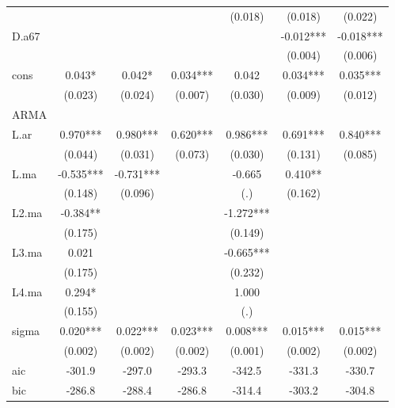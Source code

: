 \begin{tabular}{lcccccc}
            &               &               &               &     (0.018)   &     (0.018)   &     (0.022)   \\
D.a67       &               &               &               &               &      -0.012***&      -0.018***\\
            &               &               &               &               &     (0.004)   &     (0.006)   \\
cons       &       0.043*  &       0.042*  &       0.034***&       0.042   &       0.034***&       0.035***\\
            &     (0.023)   &     (0.024)   &     (0.007)   &     (0.030)   &     (0.009)   &     (0.012)   \\
\midrule
ARMA        &               &               &               &               &               &               \\
L.ar        &       0.970***&       0.980***&       0.620***&       0.986***&       0.691***&       0.840***\\
            &     (0.044)   &     (0.031)   &     (0.073)   &     (0.030)   &     (0.131)   &     (0.085)   \\
L.ma        &      -0.535***&      -0.731***&               &      -0.665   &       0.410** &               \\
            &     (0.148)   &     (0.096)   &               &         (.)   &     (0.162)   &               \\
L2.ma       &      -0.384** &               &               &      -1.272***&               &               \\
            &     (0.175)   &               &               &     (0.149)   &               &               \\
L3.ma       &       0.021   &               &               &      -0.665***&               &               \\
            &     (0.175)   &               &               &     (0.232)   &               &               \\
L4.ma       &       0.294*  &               &               &       1.000   &               &               \\
            &     (0.155)   &               &               &         (.)   &               &               \\
\midrule
sigma       &       0.020***&       0.022***&       0.023***&       0.008***&       0.015***&       0.015***\\
            &     (0.002)   &     (0.002)   &     (0.002)   &     (0.001)   &     (0.002)   &     (0.002)   \\
\midrule
aic         &      -301.9   &      -297.0   &      -293.3   &      -342.5   &      -331.3   &      -330.7   \\
bic         &      -286.8   &      -288.4   &      -286.8   &      -314.4   &      -303.2   &      -304.8   \\
\bottomrule \end{tabular} \\ 

